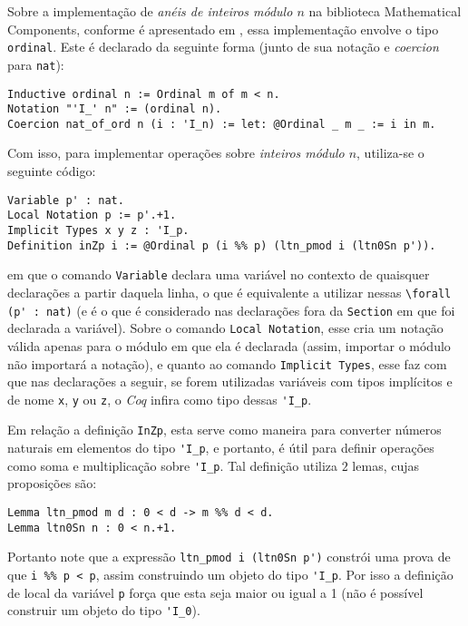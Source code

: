 Sobre a implementação de \textit{anéis de inteiros módulo $n$} na biblioteca Mathematical Components, conforme é apresentado em \cite[p.~145]{assia_mahboubi_2022_7118596}, essa implementação envolve o tipo \lstinline[language = coq]{ordinal}. Este é declarado da seguinte forma (junto de sua notação e \textit{coercion} para \lstinline[language=coq]|nat|):
    \begin{lstlisting}[language=coq,frame=single,tabsize=1]
Inductive ordinal n := Ordinal m of m < n.
Notation "'I_' n" := (ordinal n).
Coercion nat_of_ord n (i : 'I_n) := let: @Ordinal _ m _ := i in m.
    \end{lstlisting}
Com isso, para implementar operações sobre \textit{inteiros módulo $n$}, utiliza-se o seguinte código:
    \begin{lstlisting}[language=coq,frame=single,tabsize=1]
Variable p' : nat.
Local Notation p := p'.+1.
Implicit Types x y z : 'I_p.
Definition inZp i := @Ordinal p (i %% p) (ltn_pmod i (ltn0Sn p')).
    \end{lstlisting}
em que o comando \lstinline[language = coq]{Variable} declara uma variável no contexto de quaisquer declarações a partir daquela linha, o que é equivalente a utilizar nessas \lstinline[language = coq]{\forall (p' : nat)} (e é o que é considerado nas declarações fora da \lstinline[language = coq]{Section} em que foi declarada a variável). Sobre o comando \lstinline[language = coq]{Local Notation}, esse cria um notação válida apenas para o módulo em que ela é declarada (assim, importar o módulo não importará a notação), e quanto ao comando \lstinline[language = coq]{Implicit Types}, esse faz com que nas declarações a seguir, se forem utilizadas variáveis com tipos implícitos e de nome \lstinline[language = coq]{x}, \lstinline[language = coq]{y} ou \lstinline[language = coq]{z}, o \textit{Coq} infira como tipo dessas \lstinline[language = coq]{'I_p}.

Em relação a definição \lstinline[language = coq]{InZp}, esta serve como maneira para converter números naturais em elementos do tipo \lstinline[language = coq]{'I_p}, e portanto, é útil para definir operações como soma e multiplicação sobre \lstinline[language = coq]{'I_p}. Tal definição utiliza $2$ lemas, cujas proposições são:
    \begin{lstlisting}[language=coq,frame=single,tabsize=1]
Lemma ltn_pmod m d : 0 < d -> m %% d < d.
Lemma ltn0Sn n : 0 < n.+1.
    \end{lstlisting}
Portanto note que a expressão \lstinline[language = coq]{ltn_pmod i (ltn0Sn p')} constrói uma prova de que \lstinline[language = coq]{i %% p < p}, assim construindo um objeto do tipo \lstinline[language = coq]{'I_p}. Por isso a definição de local da variável \lstinline[language = coq]{p} força que esta seja maior ou igual a 1 (não é possível construir um objeto do tipo \lstinline[language = coq]{'I_0}).

